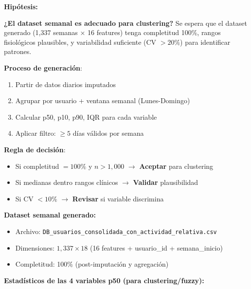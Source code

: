 \documentclass[12pt,letterpaper,twoside]{report}
\begin{document}
\begin{calculobox}
\begin{hipotesisbox}
\textbf{Hipótesis:}

\textbf{¿El dataset semanal es adecuado para clustering?} Se espera que el dataset generado (1,337 semanas × 16 features) tenga completitud 100\%, rangos fisiológicos plausibles, y variabilidad suficiente (CV $> 20\%$) para identificar patrones.
\end{hipotesisbox}

\begin{estadisticobox}
\textbf{Proceso de generación}:

\begin{enumerate}[noitemsep]
    \item Partir de datos diarios imputados
    \item Agrupar por usuario + ventana semanal (Lunes-Domingo)
    \item Calcular p50, p10, p90, IQR para cada variable
    \item Aplicar filtro: $\geq 5$ días válidos por semana
\end{enumerate}
\end{estadisticobox}

\begin{reglabox}
\textbf{Regla de decisión}:

\begin{itemize}[noitemsep]
    \item Si completitud $= 100\%$ y $n > 1,000$ $\to$ \textbf{Aceptar} para clustering
    \item Si medianas dentro rangos clínicos $\to$ \textbf{Validar} plausibilidad
    \item Si CV $< 10\%$ $\to$ \textbf{Revisar} si variable discrimina
\end{itemize}
\end{reglabox}

\begin{calculobox}
\textbf{Dataset semanal generado:}

\begin{itemize}[noitemsep]
    \item Archivo: \texttt{DB\_usuarios\_consolidada\_con\_actividad\_relativa.csv}
    \item Dimensiones: $1,337 \times 18$ (16 features + usuario\_id + semana\_inicio)
    \item Completitud: 100\% (post-imputación y agregación)
\end{itemize}

\textbf{Estadísticos de las 4 variables p50 (para clustering/fuzzy):}


\end{calculobox}
\end{calculobox}
\end{document}
